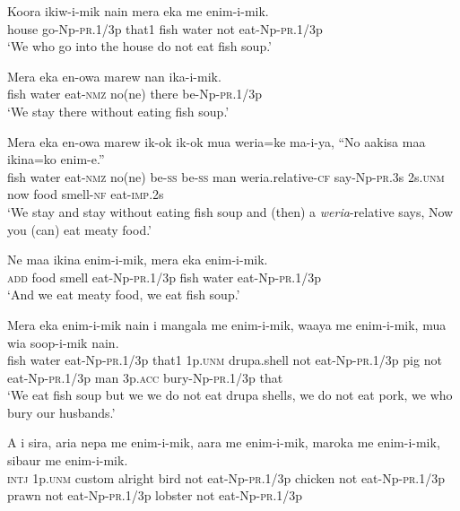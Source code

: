 \ea
\gll  Koora  ikiw-i-mik  nain  mera  eka  me  enim-i-mik. \\
house  go-Np-\textsc{pr}.1/3p  that1  fish  water  not  eat-Np-\textsc{pr}.1/3p \\
\glt ‘We who go into the house do not eat fish soup.’ \\
\z


\ea
\gll  Mera  eka  en-owa  marew  nan  ika-i-mik. \\
fish  water  eat-\textsc{nmz}  no(ne)  there  be-Np-\textsc{pr}.1/3p \\
\glt ‘We stay there without eating fish soup.’ \\
\z


\ea
\gll  Mera  eka  en-owa  marew  ik-ok  ik-ok  mua  weria=ke  ma-i-ya,            “No  aakisa  maa  ikina=ko  enim-e.” \\
fish  water  eat-\textsc{nmz}  no(ne)  be-\textsc{ss}  be-\textsc{ss}  man  weria.relative-\textsc{cf}  say-Np-\textsc{pr}.3s 2s.\textsc{unm}  now  food  smell-\textsc{nf}  eat-\textsc{imp}.2s \\


\glt ‘We stay and stay without eating fish soup and (then) a \textit{weria}{}-relative says, Now you (can) eat meaty food.’ \\
\z


\ea
\gll  Ne  maa  ikina  enim-i-mik,  mera  eka  enim-i-mik. \\
\textsc{add}  food  smell  eat-Np-\textsc{pr}.1/3p  fish  water  eat-Np-\textsc{pr}.1/3p \\
\glt ‘And we eat meaty food, we eat fish soup.’ \\
\z


\ea
\gll  Mera  eka  enim-i-mik  nain  i  mangala  me  enim-i-mik,               waaya  me  enim-i-mik,  mua  wia  soop-i-mik  nain. \\
fish  water  eat-Np-\textsc{pr}.1/3p  that1  1p.\textsc{unm}  drupa.shell  not  eat-Np-\textsc{pr}.1/3p pig  not  eat-Np-\textsc{pr}.1/3p  man  3p.\textsc{acc}  bury-Np-\textsc{pr}.1/3p  that \\


\glt ‘We eat fish soup but we we do not eat drupa shells, we do not eat pork, we who bury our husbands.’ \\
\z


\ea
\gll  A  i  sira,  aria  nepa  me  enim-i-mik,  aara              me  enim-i-mik,  maroka  me  enim-i-mik,  sibaur         me  enim-i-mik. \\
\textsc{intj}  1p.\textsc{unm}  custom  alright  bird  not  eat-Np-\textsc{pr}.1/3p  chicken not  eat-Np-\textsc{pr}.1/3p  prawn  not  eat-Np-\textsc{pr}.1/3p  lobster not  eat-Np-\textsc{pr}.1/3p \\




